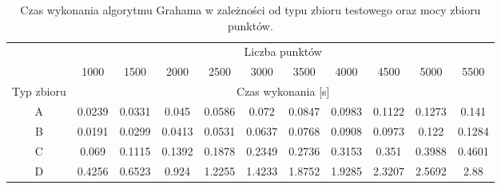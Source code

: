\documentclass[11pt]{article}
\theoremstyle{remark} \newtheorem{definition}{def.}
\theoremstyle{definition} \newtheorem{twierdzenie}{tw.}
\begin{document}
\begin{table}[]
\centering
\caption{Czas wykonania algorytmu Grahama w zależności od typu zbioru testowego oraz mocy zbioru punktów.}
\label{tab:graham}
\begin{tabular}{c|c|c|c|c|c|c|c|c|c|c|}
\cline{2-11}
 & \multicolumn{10}{c|}{Liczba punktów} \\ \cline{2-11} 
 & 1000 & 1500 & 2000 & 2500 & 3000 & 3500 & 4000 & 4500 & 5000 & 5500 \\ \hline
\multicolumn{1}{|c|}{Typ zbioru} & \multicolumn{10}{c|}{Czas wykonania [s]} \\ \hline
\multicolumn{1}{|c|}{A} & 0.0239 & 0.0331 & 0.045 & 0.0586 & 0.072 & 0.0847 & 0.0983 & 0.1122 & 0.1273 & 0.141 \\ \hline
\multicolumn{1}{|c|}{B} & 0.0191 & 0.0299 & 0.0413 & 0.0531 & 0.0637 & 0.0768 & 0.0908 & 0.0973 & 0.122 & 0.1284 \\ \hline
\multicolumn{1}{|c|}{C} & 0.069 & 0.1115 & 0.1392 & 0.1878 & 0.2349 & 0.2736 & 0.3153 & 0.351 & 0.3988 & 0.4601 \\ \hline
\multicolumn{1}{|c|}{D} & 0.4256 & 0.6523 & 0.924 & 1.2255 & 1.4233 & 1.8752 & 1.9285 & 2.3207 & 2.5692 & 2.88 \\ \hline
\end{tabular}
\end{table}
\end{document}
